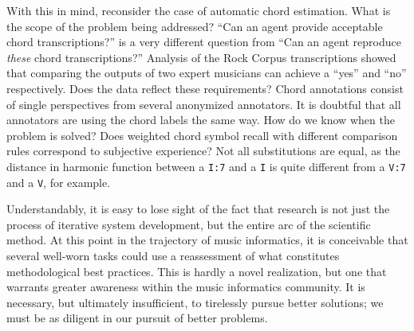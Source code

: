 With this in mind, reconsider the case of automatic chord estimation.
What is the scope of the problem being addressed?
``Can an agent provide acceptable chord transcriptions?'' is a very different question from ``Can an agent reproduce \emph{these} chord transcriptions?''
Analysis of the Rock Corpus transcriptions showed that comparing the outputs of two expert musicians can achieve a ``yes'' and ``no'' respectively.
Does the data reflect these requirements?
Chord annotations consist of single perspectives from several anonymized annotators.
It is doubtful that all annotators are using the chord labels the same way.
How do we know when the problem is solved?
Does weighted chord symbol recall with different comparison rules correspond to subjective experience?
Not all substitutions are equal, as the distance in harmonic function between a \texttt{I:7} and a \texttt{I} is quite different from a \texttt{V:7} and a \texttt{V}, for example.

Understandably, it is easy to lose sight of the fact that research is not just the process of iterative system development, but the entire arc of the scientific method.
At this point in the trajectory of music informatics, it is conceivable that several well-worn tasks could use a reassessment of what constitutes methodological best practices.
This is hardly a novel realization, but one that warrants greater awareness within the music informatics community.
It is necessary, but ultimately insufficient, to tirelessly pursue better solutions;
we must be as diligent in our pursuit of better problems.
